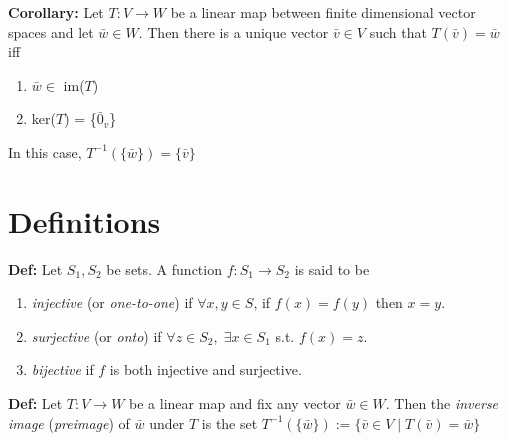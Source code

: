 \bigskip

\noindent 
\textbf{Corollary:} Let $T: V \rightarrow W$ be a linear map between finite dimensional vector spaces and let $\bar w \in W$. Then there is a unique vector $\bar v \in V$ such that $T(\bar v) = \bar w$ iff 
\begin{enumerate}
    \item $\bar w \in $ im($T$)
    \item ker($T$) = \{$\bar 0_v$\} 
\end{enumerate}
In this case, $T^{-1}(\{\bar w\}) = \{\bar v\}$


\section*{Definitions}
\textbf{Def:} Let $S_1, S_2$ be sets. A function $f: S_1 \rightarrow S_2$ is said to be 
\begin{enumerate}
    \item \textit{injective} (or \textit{one-to-one}) if $\forall x,y \in S$, if $f(x) = f(y)$ then $x = y$.
    \item \textit{surjective} (or \textit{onto}) if $\forall z \in S_2, \; \exists x \in S_1$ s.t. $f(x) = z$. 
    \item \textit{bijective} if $f$ is both injective and surjective. 
\end{enumerate}

\noindent 
\textbf{Def:} Let $T: V \rightarrow W$ be a linear map and fix any vector $\bar w \in W$. Then the \textit{inverse image} (\textit{preimage}) of $\bar w$ under $T$ is the set $T^{-1}(\{\bar w\}) := \{\bar v \in V \mid T(\bar v) = \bar w\}$ 